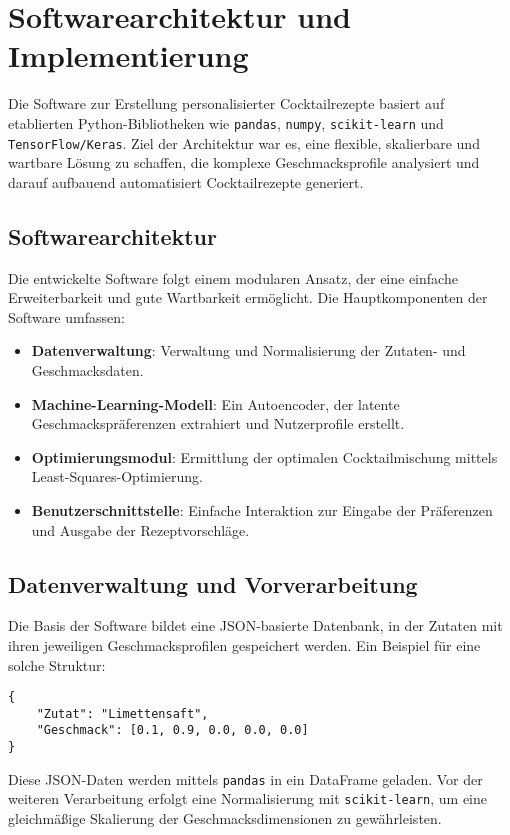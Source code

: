 \documentclass[a4paper,12pt]{article}
\begin{document}
\section{Softwarearchitektur und Implementierung}
Die Software zur Erstellung personalisierter Cocktailrezepte basiert auf etablierten Python-Bibliotheken wie \texttt{pandas}, \texttt{numpy}, \texttt{scikit-learn} und \texttt{TensorFlow/Keras}. Ziel der Architektur war es, eine flexible, skalierbare und wartbare Lösung zu schaffen, die komplexe Geschmacksprofile analysiert und darauf aufbauend automatisiert Cocktailrezepte generiert.

\subsection{Softwarearchitektur}
Die entwickelte Software folgt einem modularen Ansatz, der eine einfache Erweiterbarkeit und gute Wartbarkeit ermöglicht. Die Hauptkomponenten der Software umfassen:
\begin{itemize}
    \item \textbf{Datenverwaltung}: Verwaltung und Normalisierung der Zutaten- und Geschmacksdaten.
    \item \textbf{Machine-Learning-Modell}: Ein Autoencoder, der latente Geschmackspräferenzen extrahiert und Nutzerprofile erstellt.
    \item \textbf{Optimierungsmodul}: Ermittlung der optimalen Cocktailmischung mittels Least-Squares-Optimierung.
    \item \textbf{Benutzerschnittstelle}: Einfache Interaktion zur Eingabe der Präferenzen und Ausgabe der Rezeptvorschläge.
\end{itemize}

\subsection{Datenverwaltung und Vorverarbeitung}
Die Basis der Software bildet eine JSON-basierte Datenbank, in der Zutaten mit ihren jeweiligen Geschmacksprofilen gespeichert werden. Ein Beispiel für eine solche Struktur:

\begin{verbatim}
{
    "Zutat": "Limettensaft",
    "Geschmack": [0.1, 0.9, 0.0, 0.0, 0.0]
}
\end{verbatim}

Diese JSON-Daten werden mittels \texttt{pandas} in ein DataFrame geladen. Vor der weiteren Verarbeitung erfolgt eine Normalisierung mit \texttt{scikit-learn}, um eine gleichmäßige Skalierung der Geschmacksdimensionen zu gewährleisten.
\end{document}
